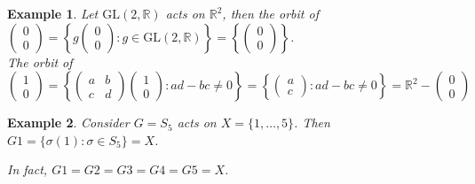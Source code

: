 \documentclass{article}
\theoremstyle{MyNonumberplain}
\theoremstyle{break}
\newcommand{\tmop}{\text}
\theoremstyle{break}
\newtheorem{example}{Example}[section]
\theoremstyle{break}
\theoremstyle{definition}
\theoremstyle{break}
\begin{document}
  \begin{expbox}
    \begin{example}
        Let $\tmop{GL} (2, \mathbb{R})$ acts on $\mathbb{R}^2$, then the orbit of
        $\left(\begin{array}{c}
        0\\
        0
        \end{array}\right) = \left\{ g \left(\begin{array}{c}
        0\\
        0
        \end{array}\right) : g \in \tmop{GL} (2, \mathbb{R}) \right\} = \left\{
        \left(\begin{array}{c}
        0\\
        0
        \end{array}\right) \right\}$.\\

        The orbit of $\left(\begin{array}{c}
        1\\
        0
        \end{array}\right) = \left\{ \left(\begin{array}{cc}
        a & b\\
        c & d
        \end{array}\right) \left(\begin{array}{c}
        1\\
        0
        \end{array}\right) : a d - b c \neq 0 \right\} = \left\{
        \left(\begin{array}{c}
        a\\
        c
        \end{array}\right) : a d - b c \neq 0 \right\} =\mathbb{R}^2 -
        \left(\begin{array}{c}
        0\\
        0
        \end{array}\right)$
    \end{example}
\end{expbox}

\begin{expbox}
    \begin{example}
        Consider $G = S_5$ acts on $X = \{ 1, \ldots, 5 \}$. Then $G 1 = \{ \sigma (1)
: \sigma \in S_5 \} = X$.

In fact, $G 1 = G 2 = G 3 = G 4 = G 5 = X$.
    \end{example}
\end{expbox}
\end{document}
